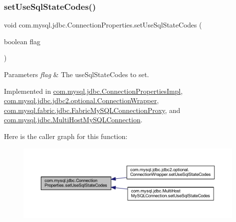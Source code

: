 \subsubsection{\texorpdfstring{set\+Use\+Sql\+State\+Codes()}{setUseSqlStateCodes()}}
{\footnotesize\ttfamily void com.\+mysql.\+jdbc.\+Connection\+Properties.\+set\+Use\+Sql\+State\+Codes (\begin{DoxyParamCaption}\item[{boolean}]{flag }\end{DoxyParamCaption})}


\begin{DoxyParams}{Parameters}
{\em flag} & The use\+Sql\+State\+Codes to set. \\
\hline
\end{DoxyParams}


Implemented in \mbox{\hyperlink{classcom_1_1mysql_1_1jdbc_1_1_connection_properties_impl_a8eabf77ac309ee2e5a22123aed0d9753}{com.\+mysql.\+jdbc.\+Connection\+Properties\+Impl}}, \mbox{\hyperlink{classcom_1_1mysql_1_1jdbc_1_1jdbc2_1_1optional_1_1_connection_wrapper_a5a221de19389e4c32fffb7532d8816ff}{com.\+mysql.\+jdbc.\+jdbc2.\+optional.\+Connection\+Wrapper}}, \mbox{\hyperlink{classcom_1_1mysql_1_1fabric_1_1jdbc_1_1_fabric_my_s_q_l_connection_proxy_a8e58d7ef8837fa41ce930d67e8f8469f}{com.\+mysql.\+fabric.\+jdbc.\+Fabric\+My\+S\+Q\+L\+Connection\+Proxy}}, and \mbox{\hyperlink{classcom_1_1mysql_1_1jdbc_1_1_multi_host_my_s_q_l_connection_a71f99bc9ca78dfeaa258b42946f7f2fd}{com.\+mysql.\+jdbc.\+Multi\+Host\+My\+S\+Q\+L\+Connection}}.

Here is the caller graph for this function\+:\nopagebreak
\begin{figure}[H]
\begin{center}
\leavevmode
\includegraphics[width=350pt]{interfacecom_1_1mysql_1_1jdbc_1_1_connection_properties_a479e40c9b5781e950ec3fca32646964b_icgraph}
\end{center}
\end{figure}
\mbox{\label{interfacecom_1_1mysql_1_1jdbc_1_1_connection_properties_a34adc2d834bd1ce90f8c8e65498906bd}} 
